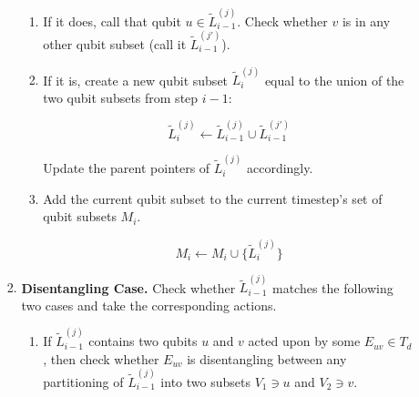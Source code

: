 \begin{enumerate}
\begin{enumerate}
\begin{enumerate}
\begin{enumerate}
\item If it does, call that qubit
$u \in \tilde{L}^{(j)}_{i-1}$.
Check whether $v$ is in any other qubit subset
(call it $\tilde{L}^{(j')}_{i-1}$).

\item
If it is, create a new qubit subset
$\tilde{L}^{(j)}_{i}$ equal to the union of the two qubit subsets from
step $i-1$:

\begin{equation*}
\tilde{L}^{(j)}_{i} \leftarrow \tilde{L}^{(j)}_{i-1} \cup \tilde{L}^{(j')}_{i-1}
\end{equation*}

Update the parent pointers of $\tilde{L}^{(j)}_{i}$ accordingly.



\item
Add the current qubit subset to the current timestep's set of qubit subsets $M_i$.

\begin{equation*}
M_i \leftarrow M_i \cup \{ \tilde{L}^{(j)}_{i} \}
\end{equation*}

\end{enumerate}

\item \textbf{Disentangling Case.} Check whether $\tilde{L}^{(j)}_{i-1}$ matches the following two cases
and take the corresponding actions.

\begin{enumerate}
\item If $\tilde{L}^{(j)}_{i-1}$ contains two qubits $u$ and $v$
acted upon by some
$E_{uv} \in T_d$, then check whether $E_{uv}$ is
disentangling between any partitioning of $\tilde{L}^{(j)}_{i-1}$ into two
subsets $V_1 \ni u$ and $V_2 \ni v$.


\end{enumerate}
\end{enumerate}
\end{enumerate}
\end{enumerate}
